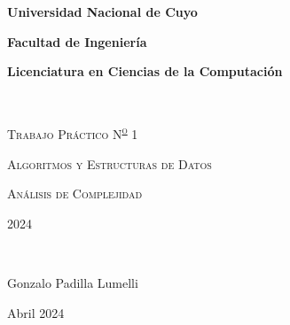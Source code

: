 {\centering
    {\bfseries\Large Universidad Nacional de Cuyo \par}
    \vspace{-0.2cm}
    {\bfseries\Large Facultad de Ingeniería \par}
    \vspace{-0.2cm}
    {\bfseries\Large Licenciatura en Ciencias de la Computación \par}
    \pagestyle{plain}
    \vfill
    \noindent\hrulefill \\
    {\scshape\Huge Trabajo Práctico N\textsuperscript{\Large\underline o} 1\par} %
    \vspace{0.5cm}
    {\scshape\Large Algoritmos y Estructuras de Datos \par}
    {\scshape\large Análisis de Complejidad \par}
    \vspace{0.5cm}
    {\scshape\Large 2024 \par} %
    \noindent\hrulefill \\
    \vspace{4cm}
    {\Large Gonzalo Padilla Lumelli \par}
    {\large Abril 2024 \par} %
    \vfill
    \setcounter{page}{1}
    \newpage
}